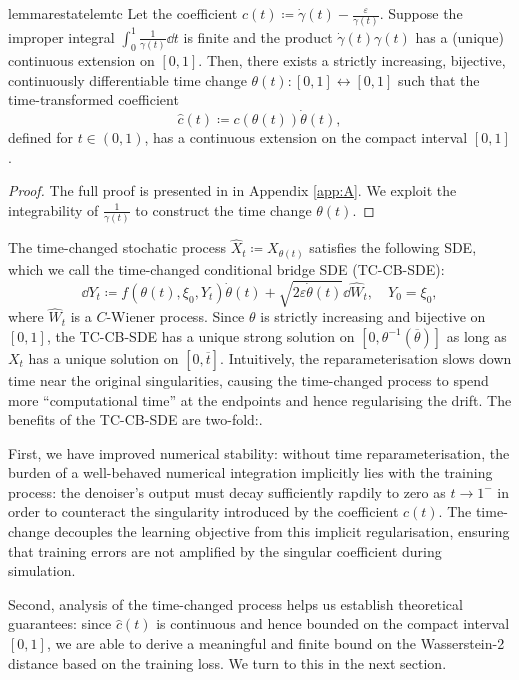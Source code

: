 \begin{restatable}{lemma}{restatelemtc}\label{lem:tc}
  Let the coefficient \(c(t) \coloneqq \dot{\gamma}(t) - \frac{\varepsilon}{\gamma(t)}\). Suppose the improper integral \(\int_{0}^{1} \frac{1}{\gamma(t)} \dd{t}\) is finite and the product \(\dot{\gamma}(t) \gamma(t) \) has a (unique) continuous extension on \([0, 1]\). Then, there exists a strictly increasing, bijective, continuously differentiable time change \(\theta(t) : [0,1] \leftrightarrow [0, 1]\) such that the time-transformed coefficient
  \[
    \hat{c}(t) \coloneqq c(\theta(t))\dot{\theta}(t),
  \]
  defined for \(t \in (0, 1)\), has a continuous extension on the compact interval \([0, 1]\).
\end{restatable}
\begin{proof}
  The full proof is presented in  in Appendix \ref{app:A}. We exploit the integrability of \(\frac{1}{\gamma(t)}\) to construct the time change \(\theta(t)\).
\end{proof}
The time-changed stochatic process \(\hat{X}_{t} \coloneqq X_{\theta(t)}\) satisfies the following SDE, which we call the time-changed conditional bridge SDE (TC-CB-SDE):
\[
  \dd{Y_{t}} \coloneqq f(\theta(t), \xi_{0}, Y_{t}) \dot{\theta}(t) + \sqrt{2\varepsilon \dot{\theta}(t)} \dd{ \hat{W}_{t}}, \quad Y_{0} = \xi_{0},
\]
where \(\hat{W}_{t}\)  is a \(C\)-Wiener process. Since \(\theta\) is strictly increasing and bijective on \([0, 1]\), the TC-CB-SDE has a unique strong solution on \([0, \theta^{-1}(\overline{\theta})]\) as long as \(X_{t}\) has a unique solution on \([0, \overline{t}]\). Intuitively, the reparameterisation slows down time near the original singularities, causing the time-changed process to spend more ``computational time'' at the endpoints and hence regularising the drift. The benefits of the TC-CB-SDE are two-fold:.

First, we have improved numerical stability:  without time reparameterisation, the burden of a well-behaved numerical integration implicitly lies with the training process: the denoiser's output must decay sufficiently rapdily to zero as \(t \to 1^{-}\) in order to counteract the singularity introduced by the coefficient \(c(t)\). The time-change decouples the learning objective from this implicit regularisation, ensuring that training errors are not amplified by the singular coefficient during simulation.

Second, analysis of the time-changed process helps us establish theoretical guarantees: since \(\hat{c}(t)\) is continuous and hence bounded on the compact interval \([0, 1]\), we are able to derive a  meaningful and finite bound on the Wasserstein-2 distance based on the training loss. We turn to this in the next section.


